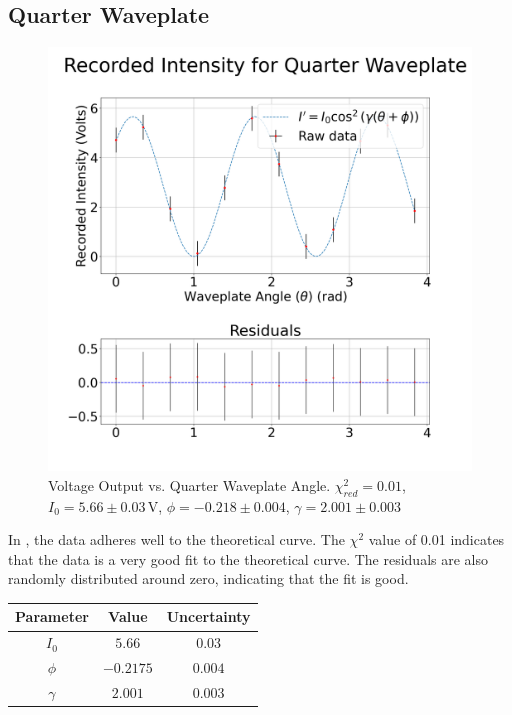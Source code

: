 \documentclass[aip, cp, amsmath, amssymb, reprint]{revtex4-2}
\begin{document}
         \subsection{Quarter Waveplate}
            \begin{figure}[H]
                \centering
                \includegraphics[width=0.9\linewidth]{../figures/Quarter.png}
                \caption{Voltage Output vs. Quarter Waveplate Angle. $\chi_{red}^2 = 0.01$, $I_0 = 5.66 \pm 0.03\,\text{V}$, $\phi = -0.218 \pm 0.004$, $\gamma = 2.001 \pm 0.003$}
                \label{fig:part2a}
            \end{figure}


            In , the data adheres well to the theoretical curve. The $\chi^2$ value of 0.01 indicates that the data is a very good fit to the theoretical curve. The residuals are also randomly distributed around zero, indicating that the fit is good.


            \begin{table}[H]
                \centering
                \begin{tabular}{c|c|c}
                    \bfseries Parameter & \bfseries Value & \bfseries Uncertainty \\
                    \hline
                    $I_0$ & $5.66$ & $0.03$ \\
                    $\phi$ & $-0.2175$ & $0.004$ \\
                    $\gamma$ & $2.001$ & $0.003$ \\
                \end{tabular}
            \end{table}
\end{document}
